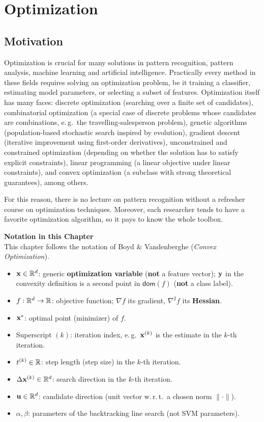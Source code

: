 \section{Optimization}

\subsection{Motivation}

Optimization is crucial for many solutions in pattern recognition, pattern analysis, machine learning and artificial intelligence. Practically every method in these fields requires solving an optimization problem, be it training a classifier, estimating model parameters, or selecting a subset of features. Optimization itself has many faces: discrete optimization (searching over a finite set of candidates), combinatorial optimization (a special case of discrete problems whose candidates are combinations, e.\,g.\ the travelling-salesperson problem), genetic algorithms (population-based stochastic search inspired by evolution), gradient descent (iterative improvement using first-order derivatives), unconstrained and constrained optimization (depending on whether the solution has to satisfy explicit constraints), linear programming (a linear objective under linear constraints), and convex optimization (a subclass with strong theoretical guarantees), among others.

For this reason, there is no lecture on pattern recognition without a refresher course on optimization techniques. Moreover, each researcher tends to have a favorite optimization algorithm, so it pays to know the whole toolbox.

\textbf{Notation in this Chapter} \\
This chapter follows the notation of Boyd \& Vandenberghe (\emph{Convex Optimization}).\autocite{boyd2004,nocedal1999}
{\small
\begin{itemize}
  \item $\bm{\mathrm{x}}\in\mathbb{R}^d$: generic \textbf{optimization variable} (\textbf{not} a feature vector); $\bm{\mathrm{y}}$ in the convexity definition is a second point in $\mathsf{dom}(f)$ (\textbf{not} a class label).
  \item $f:\mathbb{R}^d\rightarrow\mathbb{R}$: objective function; $\nabla f$ its gradient, $\nabla^2 f$ its \textbf{Hessian}.
  \item $\bm{\mathrm{x}}^*$: optimal point (minimizer) of $f$.
  \item Superscript $(k)$: iteration index, e.\,g.\ $\bm{\mathrm{x}}^{(k)}$ is the estimate in the $k$-th iteration.
  \item $t^{(k)}\in\mathbb{R}$: step length (step size) in the $k$-th iteration.
  \item $\Delta\bm{\mathrm{x}}^{(k)}\in\mathbb{R}^d$: search direction in the $k$-th iteration.
  \item $\bm{\mathrm{u}}\in\mathbb{R}^d$: candidate direction (unit vector w.\,r.\,t.\ a chosen norm $\|\cdot\|$).
  \item $\alpha,\beta$: parameters of the backtracking line search (not SVM parameters).
\end{itemize}
}


